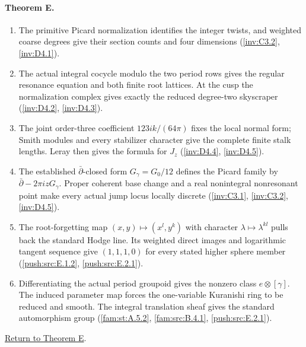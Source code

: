 \documentclass[11pt,a4paper]{article}
\theoremstyle{definition}
\begin{document}
\paragraph{Theorem E.}
\begin{enumerate}[label=\arabic*.]
\item\hypertarget{step-I-E-1}{} The primitive Picard
normalization identifies the integer twists, and weighted
coarse degrees give their section counts and four dimensions
(\hyperref[inv:C3.2]{\ref*{inv:C3.2}},
\hyperref[inv:D4.1]{\ref*{inv:D4.1}}).
\item\hypertarget{step-I-E-2}{} The actual integral cocycle
modulo the two period rows gives the regular resonance equation
and both finite root lattices.  At the cusp the normalization
complex gives exactly the reduced degree-two skyscraper
(\hyperref[inv:D4.2]{\ref*{inv:D4.2}},
\hyperref[inv:D4.3]{\ref*{inv:D4.3}}).
\item\hypertarget{step-I-E-3}{} The joint order-three
coefficient $123ik/(64\pi)$ fixes the local normal form;
Smith modules and every stabilizer character give the complete
finite stalk lengths.  Leray then gives the formula for $J_z$
(\hyperref[inv:D4.4]{\ref*{inv:D4.4}},
\hyperref[inv:D4.5]{\ref*{inv:D4.5}}).
\item\hypertarget{step-I-E-4}{} The established
$\bar\partial$-closed form $G_\gamma=G_0/12$ defines the
Picard family by $\bar\partial-2\pi izG_\gamma$.
Proper coherent base change and a real nonintegral nonresonant
point make every actual jump locus locally discrete
(\hyperref[inv:C3.1]{\ref*{inv:C3.1}},
\hyperref[inv:C3.2]{\ref*{inv:C3.2}},
\hyperref[inv:D4.5]{\ref*{inv:D4.5}}).
\item\hypertarget{step-I-E-5}{} The root-forgetting map
$(x,y)\mapsto(x^l,y^k)$ with character
$\lambda\mapsto\lambda^{kl}$ pulls back the standard Hodge
line.  Its weighted direct images and logarithmic tangent
sequence give $(1,1,1,0)$ for every stated higher sphere member
(\hyperref[push:src:E.1.2]{\ref*{push:src:E.1.2}},
\hyperref[push:src:E.2.1]{\ref*{push:src:E.2.1}}).
\item\hypertarget{step-I-E-6}{} Differentiating the actual
period groupoid gives the nonzero class $e\otimes[\gamma]$.
The induced parameter map forces the one-variable Kuranishi
ring to be reduced and smooth.  The integral translation sheaf
gives the standard automorphism group
(\hyperref[fam:st:A.5.2]{\ref*{fam:st:A.5.2}},
\hyperref[fam:src:B.4.1]{\ref*{fam:src:B.4.1}},
\hyperref[push:src:E.2.1]{\ref*{push:src:E.2.1}}).
\end{enumerate}
\hyperlink{main-I-E}{Return to Theorem E}.
\end{document}
